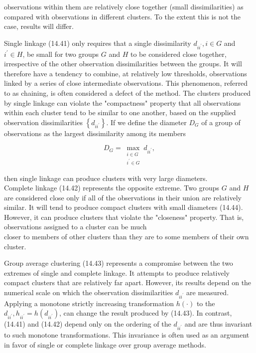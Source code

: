 \documentclass[10pt]{article}
\begin{document}
observations within them are relatively close together (small dissimilarities) as compared with observations in different clusters. To the extent this is not the case, results will differ.

Single linkage (14.41) only requires that a single dissimilarity $d_{i i^{\prime}}, i \in G$ and $i^{\prime} \in H$, be small for two groups $G$ and $H$ to be considered close together, irrespective of the other observation dissimilarities between the groups. It will therefore have a tendency to combine, at relatively low thresholds, observations linked by a series of close intermediate observations. This phenomenon, referred to as chaining, is often considered a defect of the method. The clusters produced by single linkage can violate the "compactness" property that all observations within each cluster tend to be similar to one another, based on the supplied observation dissimilarities $\left\{d_{i i^{\prime}}\right\}$. If we define the diameter $D_{G}$ of a group of observations as the largest dissimilarity among its members


\begin{equation*}
D_{G}=\max _{\substack{i \in G \\ i^{\prime} \in G}} d_{i i^{\prime}}, \tag{14.44}
\end{equation*}


then single linkage can produce clusters with very large diameters.\\
Complete linkage (14.42) represents the opposite extreme. Two groups $G$ and $H$ are considered close only if all of the observations in their union are relatively similar. It will tend to produce compact clusters with small diameters (14.44). However, it can produce clusters that violate the "closeness" property. That is, observations assigned to a cluster can be much\\
closer to members of other clusters than they are to some members of their own cluster.

Group average clustering (14.43) represents a compromise between the two extremes of single and complete linkage. It attempts to produce relatively compact clusters that are relatively far apart. However, its results depend on the numerical scale on which the observation dissimilarities $d_{i i^{\prime}}$ are measured. Applying a monotone strictly increasing transformation $h(\cdot)$ to the $d_{i i^{\prime}}, h_{i i^{\prime}}=h\left(d_{i i^{\prime}}\right)$, can change the result produced by (14.43). In contrast, (14.41) and (14.42) depend only on the ordering of the $d_{i i^{\prime}}$ and are thus invariant to such monotone transformations. This invariance is often used as an argument in favor of single or complete linkage over group average methods.
\end{document}
